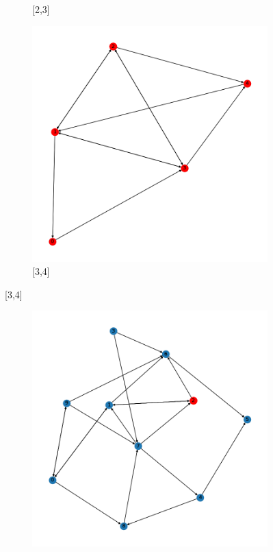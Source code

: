 \documentclass{article}
\begin{document}
\begin{problem}
\begin{figure}[!h]
\begin{subfigure}{0.2\textwidth}
        \caption{[2,3]}
    \end{subfigure}
    \begin{subfigure}{0.2\textwidth}
        \includegraphics[width=\textwidth]{./img/P1_1/frame2.png}
        \caption{[3,4]}
    \end{subfigure}
\end{figure}
\begin{figure}[!h]
    \centering
    \begin{subfigure}{0.2\textwidth}
        \includegraphics[width=\textwidth]{./img/P1_2/frame0.png}

\end{subfigure}
\end{figure}
\end{problem}
\end{document}
